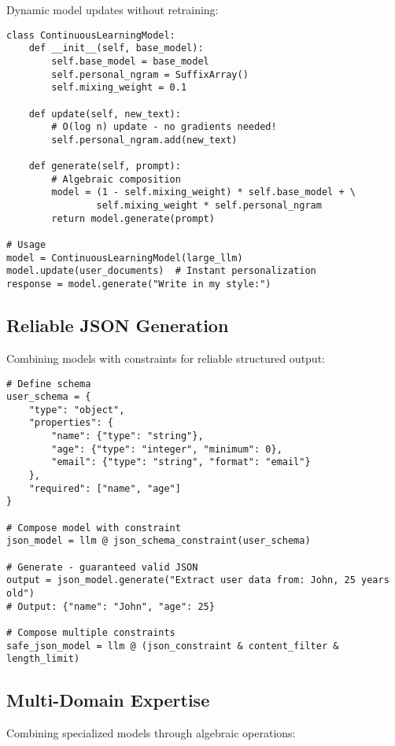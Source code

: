 \documentclass{article}
\theoremstyle{definition}
\begin{document}
Dynamic model updates without retraining:

\begin{lstlisting}
class ContinuousLearningModel:
    def __init__(self, base_model):
        self.base_model = base_model
        self.personal_ngram = SuffixArray()
        self.mixing_weight = 0.1

    def update(self, new_text):
        # O(log n) update - no gradients needed!
        self.personal_ngram.add(new_text)

    def generate(self, prompt):
        # Algebraic composition
        model = (1 - self.mixing_weight) * self.base_model + \
                self.mixing_weight * self.personal_ngram
        return model.generate(prompt)

# Usage
model = ContinuousLearningModel(large_llm)
model.update(user_documents)  # Instant personalization
response = model.generate("Write in my style:")
\end{lstlisting}

\subsection{Reliable JSON Generation}

Combining models with constraints for reliable structured output:

\begin{lstlisting}
# Define schema
user_schema = {
    "type": "object",
    "properties": {
        "name": {"type": "string"},
        "age": {"type": "integer", "minimum": 0},
        "email": {"type": "string", "format": "email"}
    },
    "required": ["name", "age"]
}

# Compose model with constraint
json_model = llm @ json_schema_constraint(user_schema)

# Generate - guaranteed valid JSON
output = json_model.generate("Extract user data from: John, 25 years old")
# Output: {"name": "John", "age": 25}

# Compose multiple constraints
safe_json_model = llm @ (json_constraint & content_filter & length_limit)
\end{lstlisting}

\subsection{Multi-Domain Expertise}

Combining specialized models through algebraic operations:
\end{document}
